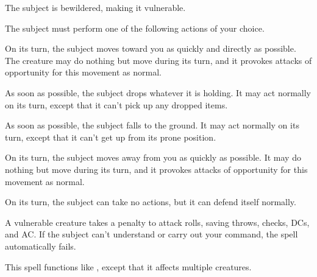 \spellrng{\rngmed}
\begin{spellhealthy}
  The subject is bewildered, making it vulnerable.
\end{spellhealthy}
\begin{spellblood}
  The subject must perform one of the following actions of your choice.
  \par {} On its turn, the subject moves toward you as quickly and directly as possible. The creature may do nothing but move during its turn, and it provokes attacks of opportunity for this movement as normal.
  \par {} As soon as possible, the subject drops whatever it is holding. It may act normally on its turn, except that it can't pick up any dropped items.
  \par {} As soon as possible, the subject falls to the ground. It may act normally on its turn, except that it can't get up from its prone position.
  \par {} On its turn, the subject moves away from you as quickly as possible. It may do nothing but move during its turn, and it provokes attacks of opportunity for this movement as normal.
  \par {} On its turn, the subject can take no actions, but it can defend itself normally.
\end{spellblood}
\begin{spellnotes}
  A vulnerable creature takes a  penalty to attack rolls, saving throws, checks, DCs, and AC.
  If the subject can't understand or carry out your command, the spell automatically fails.
\end{spellnotes}

\begin{spelleffect}
  This spell functions like , except that it affects multiple creatures.
\end{spelleffect}

